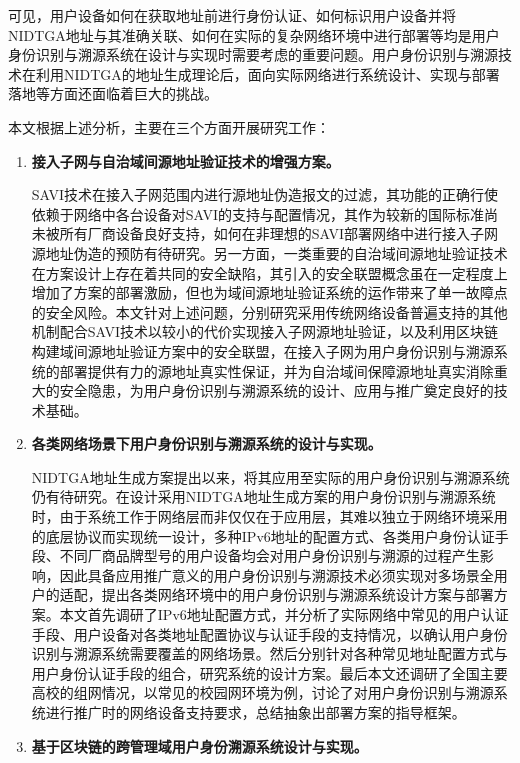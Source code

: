   可见，用户设备如何在获取地址前进行身份认证、如何标识用户设备并将NIDTGA地址与其准确关联、如何在实际的复杂网络环境中进行部署等均是用户身份识别与溯源系统在设计与实现时需要考虑的重要问题。用户身份识别与溯源技术在利用NIDTGA的地址生成理论后，面向实际网络进行系统设计、实现与部署落地等方面还面临着巨大的挑战。

  本文根据上述分析，主要在三个方面开展研究工作：
  \begin{enumerate}[1{)}]
    \item \textbf{接入子网与自治域间源地址验证技术的增强方案。}

    SAVI技术在接入子网范围内进行源地址伪造报文的过滤，其功能的正确行使依赖于网络中各台设备对SAVI的支持与配置情况，其作为较新的国际标准尚未被所有厂商设备良好支持，如何在非理想的SAVI部署网络中进行接入子网源地址伪造的预防有待研究。另一方面，一类重要的自治域间源地址验证技术在方案设计上存在着共同的安全缺陷，其引入的安全联盟概念虽在一定程度上增加了方案的部署激励，但也为域间源地址验证系统的运作带来了单一故障点的安全风险。本文针对上述问题，分别研究采用传统网络设备普遍支持的其他机制配合SAVI技术以较小的代价实现接入子网源地址验证，以及利用区块链构建域间源地址验证方案中的安全联盟，在接入子网为用户身份识别与溯源系统的部署提供有力的源地址真实性保证，并为自治域间保障源地址真实消除重大的安全隐患，为用户身份识别与溯源系统的设计、应用与推广奠定良好的技术基础。

    \item \textbf{各类网络场景下用户身份识别与溯源系统的设计与实现。}

    NIDTGA地址生成方案提出以来，将其应用至实际的用户身份识别与溯源系统仍有待研究。在设计采用NIDTGA地址生成方案的用户身份识别与溯源系统时，由于系统工作于网络层而非仅仅在于应用层，其难以独立于网络环境采用的底层协议而实现统一设计，多种IPv6地址的配置方式、各类用户身份认证手段、不同厂商品牌型号的用户设备均会对用户身份识别与溯源的过程产生影响，因此具备应用推广意义的用户身份识别与溯源技术必须实现对多场景全用户的适配，提出各类网络环境中的用户身份识别与溯源系统设计方案与部署方案。本文首先调研了IPv6地址配置方式，并分析了实际网络中常见的用户认证手段、用户设备对各类地址配置协议与认证手段的支持情况，以确认用户身份识别与溯源系统需要覆盖的网络场景。然后分别针对各种常见地址配置方式与用户身份认证手段的组合，研究系统的设计方案。最后本文还调研了全国主要高校的组网情况，以常见的校园网环境为例，讨论了对用户身份识别与溯源系统进行推广时的网络设备支持要求，总结抽象出部署方案的指导框架。

    \item \textbf{基于区块链的跨管理域用户身份溯源系统设计与实现。}


\end{enumerate}
